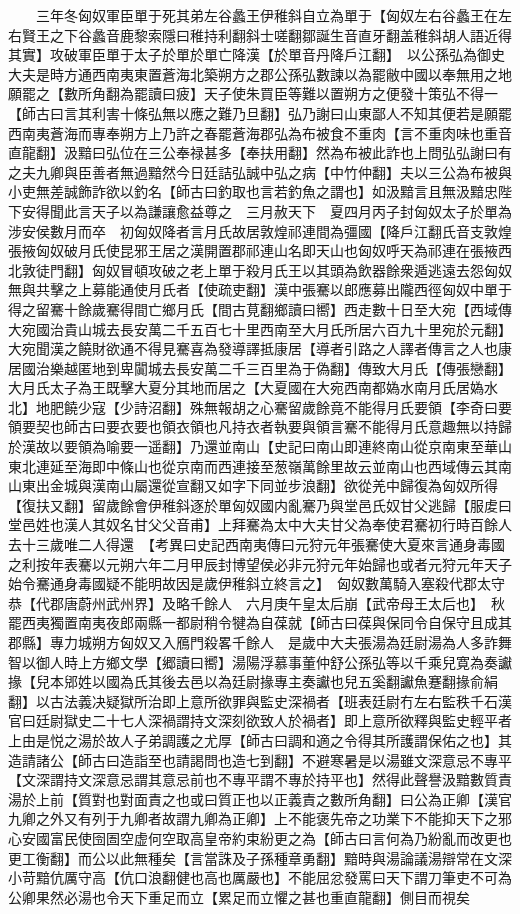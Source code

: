 　　三年冬匈奴軍臣單于死其弟左谷蠡王伊稚斜自立為單于【匈奴左右谷蠡王在左右賢王之下谷蠡音鹿黎索隱曰稚持利翻斜士嗟翻鄒誕生音直牙翻盖稚斜胡人語近得其實】攻破軍臣單于太子於單於單亡降漢【於單音丹降戶江翻】　以公孫弘為御史大夫是時方通西南夷東置蒼海北築朔方之郡公孫弘數諫以為罷敝中國以奉無用之地願罷之【數所角翻為罷讀曰疲】天子使朱買臣等難以置朔方之便發十策弘不得一【師古曰言其利害十條弘無以應之難乃旦翻】弘乃謝曰山東鄙人不知其便若是願罷西南夷蒼海而專奉朔方上乃許之春罷蒼海郡弘為布被食不重肉【言不重肉味也重音直龍翻】汲黯曰弘位在三公奉禄甚多【奉扶用翻】然為布被此詐也上問弘弘謝曰有之夫九卿與臣善者無過黯然今日廷詰弘誠中弘之病【中竹仲翻】夫以三公為布被與小吏無差誠飾詐欲以釣名【師古曰釣取也言若釣魚之謂也】如汲黯言且無汲黯忠陛下安得聞此言天子以為謙讓愈益尊之　三月赦天下　夏四月丙子封匈奴太子於單為涉安侯數月而卒　初匈奴降者言月氏故居敦煌祁連間為彊國【降戶江翻氏音支敦煌張掖匈奴破月氏使昆邪王居之漢開置郡祁連山名即天山也匈奴呼天為祁連在張掖西北敦徒門翻】匈奴冒頓攻破之老上單于殺月氏王以其頭為飲器餘衆遁逃遠去怨匈奴無與共擊之上募能通使月氏者【使疏吏翻】漢中張騫以郎應募出隴西徑匈奴中單于得之留騫十餘歲騫得間亡鄉月氏【間古莧翻鄉讀曰嚮】西走數十日至大宛【西域傳大宛國治貴山城去長安萬二千五百七十里西南至大月氏所居六百九十里宛於元翻】大宛聞漢之饒財欲通不得見騫喜為發導譯抵康居【導者引路之人譯者傳言之人也康居國治樂越匿地到卑闐城去長安萬二千三百里為于偽翻】傳致大月氏【傳張戀翻】大月氏太子為王既擊大夏分其地而居之【大夏國在大宛西南都媯水南月氏居媯水北】地肥饒少寇【少詩沼翻】殊無報胡之心騫留歲餘竟不能得月氏要領【李奇曰要領要契也師古曰要衣要也領衣領也凡持衣者執要與領言騫不能得月氏意趣無以持歸於漢故以要領為喻要一遥翻】乃還並南山【史記曰南山即連終南山從京南東至華山東北連延至海即中條山也從京南而西連接至葱嶺萬餘里故云並南山也西域傳云其南山東出金城與漢南山屬還從宣翻又如字下同並步浪翻】欲從羌中歸復為匈奴所得【復扶又翻】留歲餘會伊稚斜逐於單匈奴國内亂騫乃與堂邑氏奴甘父逃歸【服䖍曰堂邑姓也漢人其奴名甘父父音甫】上拜騫為太中大夫甘父為奉使君騫初行時百餘人去十三歲唯二人得還　【考異曰史記西南夷傳曰元狩元年張騫使大夏來言通身毒國之利按年表騫以元朔六年二月甲辰封博望侯必非元狩元年始歸也或者元狩元年天子始令騫通身毒國疑不能明故因是歲伊稚斜立終言之】　匈奴數萬騎入塞殺代郡太守恭【代郡唐蔚州武州界】及略千餘人　六月庚午皇太后崩【武帝母王太后也】　秋罷西夷獨置南夷夜郎兩縣一都尉稍令犍為自葆就【師古曰葆與保同令自保守且成其郡縣】專力城朔方匈奴又入鴈門殺畧千餘人　是歲中大夫張湯為廷尉湯為人多詐舞智以御人時上方鄉文學【郷讀曰嚮】湯陽浮慕事董仲舒公孫弘等以千乘兒寛為奏讞掾【兒本郳姓以國為氏其後去邑以為廷尉掾專主奏讞也兒五奚翻讞魚蹇翻掾俞絹翻】以古法義决疑獄所治即上意所欲罪與監史深禍者【班表廷尉冇左右監秩千石漢官曰廷尉獄史二十七人深禍謂持文深刻欲致人於禍者】即上意所欲釋與監史輕平者上由是悦之湯於故人子弟調護之尤厚【師古曰調和適之令得其所護謂保佑之也】其造請諸公【師古曰造詣至也請謁問也造七到翻】不避寒暑是以湯雖文深意忌不專平【文深謂持文深意忌謂其意忌前也不專平謂不專於持平也】然得此聲譽汲黯數質責湯於上前【質對也對面責之也或曰質正也以正義責之數所角翻】曰公為正卿【漢官九卿之外又有列于九卿者故謂九卿為正卿】上不能褒先帝之功業下不能抑天下之邪心安國富民使囹圄空虚何空取高皇帝約束紛更之為【師古曰言何為乃紛亂而改更也更工衡翻】而公以此無種矣【言當誅及子孫種章勇翻】黯時與湯論議湯辯常在文深小苛黯伉厲守高【伉口浪翻健也高也厲嚴也】不能屈忿發罵曰天下謂刀筆吏不可為公卿果然必湯也令天下重足而立【累足而立懼之甚也重直龍翻】側目而視矣


